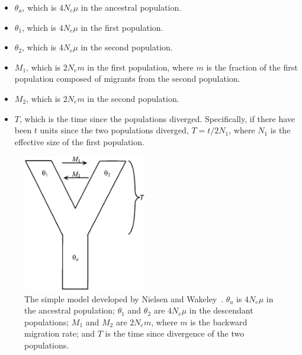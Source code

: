 \documentclass[12pt]{article}
\begin{document}
\begin{itemize}

\item $\theta_a$, which is $4N_e\mu$ in the ancestral population.

\item $\theta_1$, which is $4N_e\mu$ in the first population.

\item $\theta_2$, which is $4N_e\mu$ in the second population.

\item $M_1$, which is $2N_em$ in the first population, where $m$ is
  the fraction of the first population composed of migrants from the
  second population.

\item $M_2$, which is $2N_em$ in the second population.

\item $T$, which is the time since the populations
  diverged. Specifically, if there have been $t$ units since
  the two populations diverged, $T=t/2N_1$, where $N_1$ is the
  effective size of the first population.

\end{itemize}

\begin{figure}
\begin{center}
\includegraphics[height=6cm]{nielsen-wakeley.eps}
\end{center}
\caption{The simple model developed by Nielsen and
  Wakeley~\cite{Nielsen-Wakeley-2001}. $\theta_a$ is $4N_e\mu$ in the
  ancestral population; $\theta_1$ and $\theta_2$ are $4N_e\mu$ in the
  descendant populations; $M_1$ and $M_2$ are $2N_em$, where $m$ is
  the backward migration rate; and $T$ is the time since divergence of
  the two populations.}\label{fig:nielsen-wakeley}
\end{figure}
\end{document}
